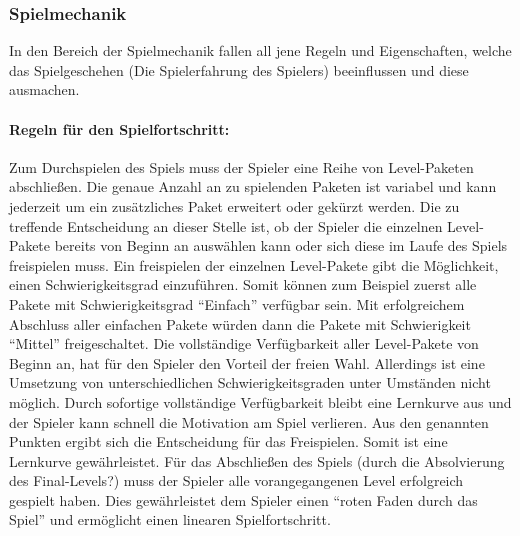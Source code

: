 	\subsubsection{Spielmechanik}\label{sssec:spielmechanik}
	In den Bereich der Spielmechanik fallen all jene Regeln und Eigenschaften, welche das Spielgeschehen (Die Spielerfahrung des Spielers) beeinflussen und diese ausmachen.

		\paragraph{Regeln für den Spielfortschritt:}
		Zum Durchspielen des Spiels muss der Spieler eine Reihe von Level-Paketen abschließen. Die genaue Anzahl an zu spielenden Paketen ist variabel und kann jederzeit um ein zusätzliches Paket erweitert oder gekürzt werden. Die zu treffende Entscheidung an dieser Stelle ist, ob der Spieler die einzelnen Level-Pakete bereits von Beginn an auswählen kann oder sich diese im Laufe des Spiels freispielen muss. Ein freispielen der einzelnen Level-Pakete gibt die Möglichkeit, einen Schwierigkeitsgrad einzuführen. Somit können zum Beispiel zuerst alle Pakete mit Schwierigkeitsgrad \enquote{Einfach} verfügbar sein. Mit erfolgreichem Abschluss aller einfachen Pakete würden dann die Pakete mit Schwierigkeit \enquote{Mittel} freigeschaltet.
		Die vollständige Verfügbarkeit aller Level-Pakete von Beginn an, hat für den Spieler den Vorteil der freien Wahl. Allerdings ist eine Umsetzung von unterschiedlichen Schwierigkeitsgraden unter Umständen nicht möglich. Durch sofortige vollständige Verfügbarkeit bleibt eine Lernkurve aus und der Spieler kann schnell die Motivation am Spiel verlieren.
		Aus den genannten Punkten ergibt sich die Entscheidung für das Freispielen. Somit ist eine Lernkurve gewährleistet. Für das Abschließen des Spiels (durch die Absolvierung des Final-Levels?) muss der Spieler alle vorangegangenen Level erfolgreich gespielt haben. Dies gewährleistet dem Spieler einen \enquote{roten Faden durch das Spiel} und ermöglicht einen linearen Spielfortschritt.

